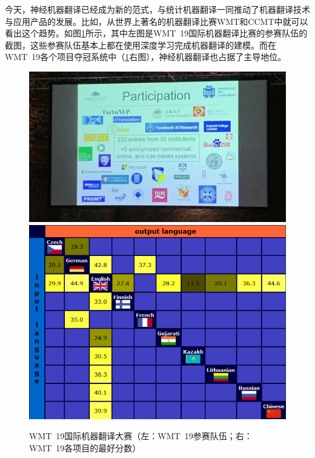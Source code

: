 \parinterval 今天，神经机器翻译已经成为新的范式，与统计机器翻译一同推动了机器翻译技术与应用产品的发展。比如，从世界上著名的机器翻译比赛WMT和CCMT中就可以看出这个趋势。如图\ref{fig:1-5}所示，其中左图是WMT\ 19国际机器翻译比赛的参赛队伍的截图，这些参赛队伍基本上都在使用深度学习完成机器翻译的建模。而在WMT\ 19各个项目夺冠系统中（\ref{fig:1-5}右图），神经机器翻译也占据了主导地位。

\begin{figure}[htp]
    \centering
\includegraphics[scale=0.3]{./Chapter1/Figures/figure-wmt-participation.jpg}
\includegraphics[scale=0.3]{./Chapter1/Figures/figure-wmt-bestresults.jpg}
\setlength{\belowcaptionskip}{-1.5em}
    \caption{WMT\ 19国际机器翻译大赛（左：WMT\ 19参赛队伍；右：WMT\ 19各项目的最好分数）}
    \label{fig:1-5}
\end{figure}

